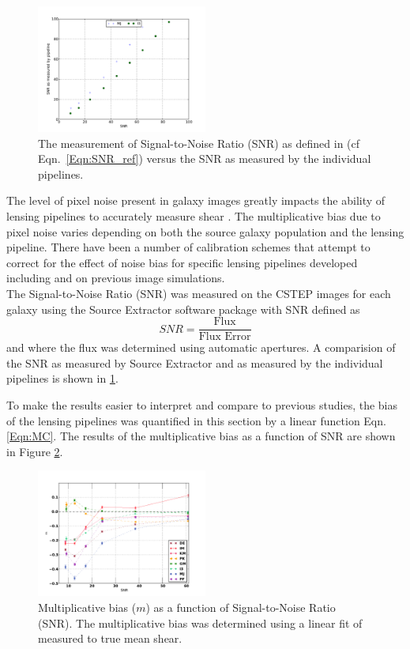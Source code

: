 \begin{figure}
 \centering  %
  \includegraphics[width=0.5\textwidth]{fig/SNR_mfix.pdf} 
  \caption{The measurement of Signal-to-Noise Ratio (SNR) as defined
    in (cf Eqn.~\ref{Eqn:SNR_ref}) versus the SNR as measured by the
    individual pipelines.}
\label{fig:Snr_comp}
\end{figure}

The level of pixel noise present in galaxy images
greatly impacts the ability of lensing pipelines 
to accurately measure shear \citep[e.g.][]{peter_n, Okura_n, R_n}. 
The multiplicative bias due to pixel noise varies 
depending on both the source galaxy population
and the lensing pipeline. There have been a number
of calibration schemes that attempt to correct for the
effect of noise bias for specific lensing pipelines developed
including \citep{K_n} and \citep{cfhtls} on previous image 
simulations.  \\
\indent The Signal-to-Noise Ratio (SNR) was measured on the CSTEP images
for each galaxy using the Source Extractor software package 
\citep{Sext} with SNR defined as  
\begin{equation}\label{Eqn:SNR_ref}
SNR = \frac{\textrm{Flux}}{\textrm{Flux Error}}
\end{equation}
and where the flux was determined using automatic apertures.  A
comparision of the SNR as measured by Source Extractor and as measured
by the individual pipelines is shown in \ref{fig:Snr_comp}. 

To make the results easier to interpret and compare to previous
studies, the bias of the lensing pipelines was quantified in this
section by a linear function Eqn. \ref{Eqn:MC}.
The results of the multiplicative bias as a function of SNR are shown in Figure \ref{fig:Snr}. 
\begin{figure}
 \centering  %
  \includegraphics[width=0.5\textwidth]{fig/MvalSNR_v2.pdf} 
  \caption{Multiplicative bias ($m$) as a function
    of Signal-to-Noise Ratio (SNR). The multiplicative bias was determined
    using a linear fit of measured to true mean shear.}
\label{fig:Snr}
\end{figure}


